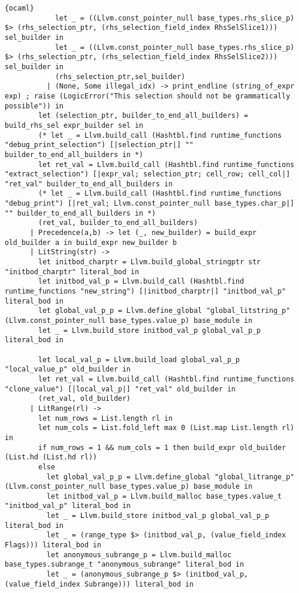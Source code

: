 \begin{lstlisting}{ocaml}
            let _ = ((Llvm.const_pointer_null base_types.rhs_slice_p) $> (rhs_selection_ptr, (rhs_selection_field_index RhsSelSlice1))) sel_builder in
            let _ = ((Llvm.const_pointer_null base_types.rhs_slice_p) $> (rhs_selection_ptr, (rhs_selection_field_index RhsSelSlice2))) sel_builder in
            (rhs_selection_ptr,sel_builder)
          | (None, Some illegal_idx) -> print_endline (string_of_expr exp) ; raise (LogicError("This selection should not be grammatically possible")) in
        let (selection_ptr, builder_to_end_all_builders) = build_rhs_sel expr_builder sel in
        (* let _ = Llvm.build_call (Hashtbl.find runtime_functions "debug_print_selection") [|selection_ptr|] "" builder_to_end_all_builders in *)
        let ret_val = Llvm.build_call (Hashtbl.find runtime_functions "extract_selection") [|expr_val; selection_ptr; cell_row; cell_col|] "ret_val" builder_to_end_all_builders in
        (* let _ = Llvm.build_call (Hashtbl.find runtime_functions "debug_print") [|ret_val; Llvm.const_pointer_null base_types.char_p|] "" builder_to_end_all_builders in *)
        (ret_val, builder_to_end_all_builders)
      | Precedence(a,b) -> let (_, new_builder) = build_expr old_builder a in build_expr new_builder b
      | LitString(str) ->
        let initbod_charptr = Llvm.build_global_stringptr str "initbod_charptr" literal_bod in
        let initbod_val_p = Llvm.build_call (Hashtbl.find runtime_functions "new_string") [|initbod_charptr|] "initbod_val_p" literal_bod in
        let global_val_p_p = Llvm.define_global "global_litstring_p" (Llvm.const_pointer_null base_types.value_p) base_module in
        let _ = Llvm.build_store initbod_val_p global_val_p_p literal_bod in

        let local_val_p = Llvm.build_load global_val_p_p "local_value_p" old_builder in
        let ret_val = Llvm.build_call (Hashtbl.find runtime_functions "clone_value") [|local_val_p|] "ret_val" old_builder in
        (ret_val, old_builder)
      | LitRange(rl) ->
        let num_rows = List.length rl in
        let num_cols = List.fold_left max 0 (List.map List.length rl) in
        if num_rows = 1 && num_cols = 1 then build_expr old_builder (List.hd (List.hd rl))
        else
          let global_val_p_p = Llvm.define_global "global_litrange_p" (Llvm.const_pointer_null base_types.value_p) base_module in
          let initbod_val_p = Llvm.build_malloc base_types.value_t "initbod_val_p" literal_bod in
          let _ = Llvm.build_store initbod_val_p global_val_p_p literal_bod in
          let _ = (range_type $> (initbod_val_p, (value_field_index Flags))) literal_bod in
          let anonymous_subrange_p = Llvm.build_malloc base_types.subrange_t "anonymous_subrange" literal_bod in
          let _ = (anonymous_subrange_p $> (initbod_val_p, (value_field_index Subrange))) literal_bod in


\end{lstlisting}
